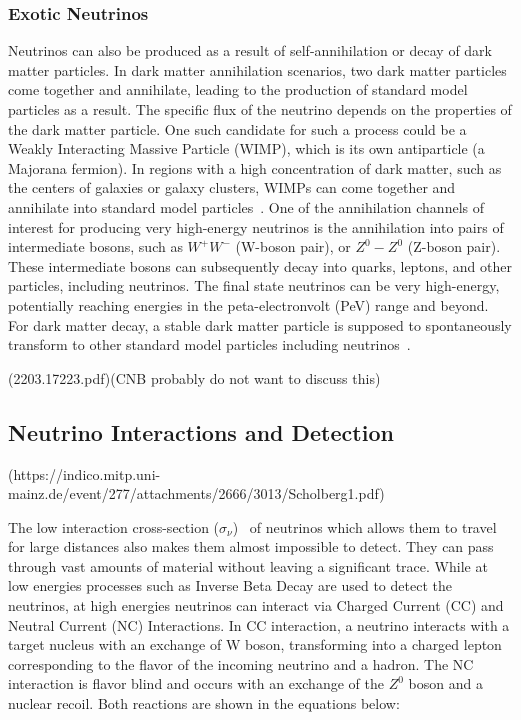 \subsubsection*{Exotic Neutrinos}
\label{subsubsec:ExoticNu}

Neutrinos can also be produced as a result of self-annihilation or decay of dark matter particles. In dark matter annihilation scenarios, two dark matter particles come together and annihilate, leading to the production of standard model particles as a result. The specific flux of the neutrino depends on the properties of the dark matter particle. One such candidate for such a process could be a Weakly Interacting Massive Particle (WIMP), which is its own antiparticle (a Majorana fermion). In regions with a high concentration of dark matter, such as the centers of galaxies or galaxy clusters, WIMPs can come together and annihilate into standard model particles~\cite{10.1111/j.1365-2966.2008.13366.x}. One of the annihilation channels of interest for producing very high-energy neutrinos is the annihilation into pairs of intermediate bosons, such as $W^+W^-$ (W-boson pair), or $Z^0 - Z^0$ (Z-boson pair). These intermediate bosons can subsequently decay into quarks, leptons, and other particles, including neutrinos. The final state neutrinos can be very high-energy, potentially reaching energies in the peta-electronvolt (PeV) range and beyond. For dark matter decay, a stable dark matter particle is supposed to spontaneously transform to other standard model particles including neutrinos~\cite{PhysRevD.108.123021}. 

(2203.17223.pdf)(CNB probably do not want to discuss this)


\subsection{Neutrino Interactions and Detection }(https://indico.mitp.uni-mainz.de/event/277/attachments/2666/3013/Scholberg1.pdf)
\label{subsec:Nuintdet}

The low interaction cross-section ($\sigma_{\nu}$)~\cite{Formaggio_2012} of neutrinos which allows them to travel for large distances also makes them almost impossible to detect. They can pass through vast amounts of material without leaving a significant trace. While at low energies processes such as Inverse Beta Decay are used to detect the neutrinos, at high energies neutrinos can interact via Charged Current (CC) and Neutral Current (NC) Interactions. In CC interaction, a neutrino interacts with a target nucleus with an exchange of W boson, transforming into a charged lepton corresponding to the flavor of the incoming neutrino and a hadron. The NC interaction is flavor blind and occurs with an exchange of the $Z^0$ boson and a nuclear recoil. Both reactions are shown in the equations below:

